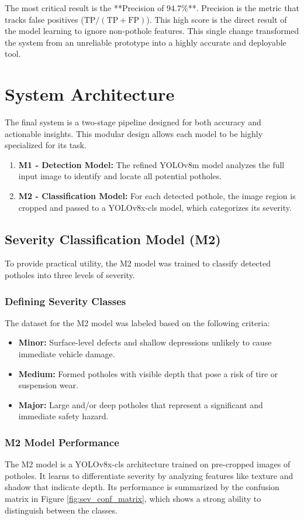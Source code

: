 \documentclass[twocolumn]{article}
\begin{document}
The most critical result is the **Precision of 94.7\%**. Precision is the metric that tracks false positives ($\text{TP} / (\text{TP} + \text{FP})$). This high score is the direct result of the model learning to ignore non-pothole features. This single change transformed the system from an unreliable prototype into a highly accurate and deployable tool.

\section{System Architecture}
The final system is a two-stage pipeline designed for both accuracy and actionable insights. This modular design allows each model to be highly specialized for its task.

\begin{enumerate}
    \item \textbf{M1 - Detection Model:} The refined YOLOv8m model analyzes the full input image to identify and locate all potential potholes.
    \item \textbf{M2 - Classification Model:} For each detected pothole, the image region is cropped and passed to a YOLOv8x-cls model, which categorizes its severity.
\end{enumerate}

\subsection{Severity Classification Model (M2)}
To provide practical utility, the M2 model was trained to classify detected potholes into three levels of severity.

\subsubsection{Defining Severity Classes}
The dataset for the M2 model was labeled based on the following criteria:
\begin{itemize}
    \item \textbf{Minor:} Surface-level defects and shallow depressions unlikely to cause immediate vehicle damage.
    \item \textbf{Medium:} Formed potholes with visible depth that pose a risk of tire or suspension wear.
    \item \textbf{Major:} Large and/or deep potholes that represent a significant and immediate safety hazard.
\end{itemize}

\subsubsection{M2 Model Performance}
The M2 model is a YOLOv8x-cls architecture trained on pre-cropped images of potholes. It learns to differentiate severity by analyzing features like texture and shadow that indicate depth. Its performance is summarized by the confusion matrix in Figure \ref{fig:sev_conf_matrix}, which shows a strong ability to distinguish between the classes.
\end{document}
